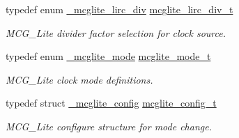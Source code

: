 \begin{DoxyCompactItemize}
\mbox{\label{group__clock_gaca07fe4bde2c34163d52f6f8507368ba}} 
typedef enum \mbox{\hyperlink{group__clock_ga55ed975b54e118a84549accb908bc08e}{\+\_\+mcglite\+\_\+lirc\+\_\+div}} \mbox{\hyperlink{group__clock_gaca07fe4bde2c34163d52f6f8507368ba}{mcglite\+\_\+lirc\+\_\+div\+\_\+t}}
\begin{DoxyCompactList}\small\item\em M\+C\+G\+\_\+\+Lite divider factor selection for clock source. \end{DoxyCompactList}\item 
\mbox{\label{group__clock_ga7ba2816f49b1b008daa37a55e34dc4a1}} 
typedef enum \mbox{\hyperlink{group__clock_ga11d70560b1f08560bba4d6fbb649c6da}{\+\_\+mcglite\+\_\+mode}} \mbox{\hyperlink{group__clock_ga7ba2816f49b1b008daa37a55e34dc4a1}{mcglite\+\_\+mode\+\_\+t}}
\begin{DoxyCompactList}\small\item\em M\+C\+G\+\_\+\+Lite clock mode definitions. \end{DoxyCompactList}\item 
\mbox{\label{group__clock_gaabff5dfd46b7233a64d3f3e4b47d908d}} 
typedef struct \mbox{\hyperlink{struct__mcglite__config}{\+\_\+mcglite\+\_\+config}} \mbox{\hyperlink{group__clock_gaabff5dfd46b7233a64d3f3e4b47d908d}{mcglite\+\_\+config\+\_\+t}}
\begin{DoxyCompactList}\small\item\em M\+C\+G\+\_\+\+Lite configure structure for mode change. \end{DoxyCompactList}\end{DoxyCompactItemize}

